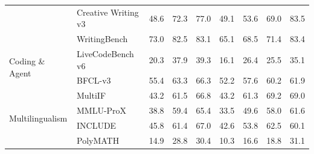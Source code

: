 \begin{table}[t]
\begin{tabular}{lllllllll}
                                 & Creative   Writing v3            & 48.6                 & 72.3                 & 77.0                 & 49.1                & 53.6              & 69.0              & 83.5                   \\
                                 & WritingBench                     & 73.0                 & 82.5                 & 83.1                 & 65.1                & 68.5              & 71.4              & 83.4                   \\
\midrule
\multirow{2}{*}{Coding   \& Agent} & LiveCodeBench v6 & 20.3                 & 37.9                 & 39.3                 & 16.1                & 26.4              & 25.5              & 35.1                   \\
                                 & BFCL-v3                          & 55.4                 & 63.3                 & 66.3                 & 52.2                & 57.6              & 60.2              & 61.9                   \\
\midrule
\multirow{4}{*}{Multilingualism} & MultiIF                          & 43.2                 & 61.5                 & 66.8                 & 43.2                & 61.3              & 69.2              & 69.0                   \\
                                 & MMLU-ProX                        & 38.8                 & 59.4                 & 65.4                 & 33.5                & 49.6              & 58.0              & 61.6                   \\
                                 & INCLUDE                          & 45.8                 & 61.4                 & 67.0                 & 42.6                & 53.8              & 62.5              & 60.1                   \\
                                 & PolyMATH                         & 14.9                 & 28.8                 & 30.4                 & 10.3                & 16.6              & 18.8              & 31.1    \\
\bottomrule
\end{tabular}
\label{tab: exp_qwen3_vl_2b_4b_8b_nothinking}
\end{table}

